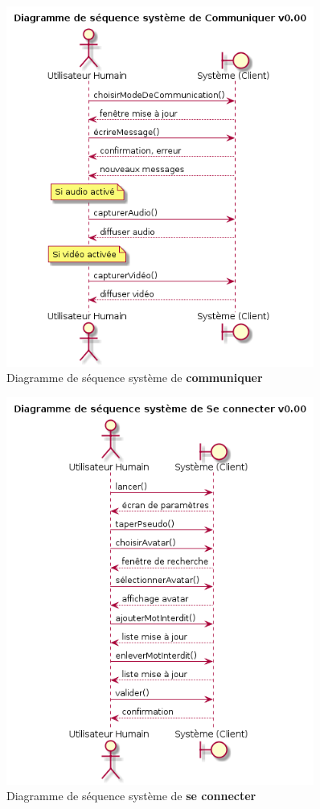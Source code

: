 \documentclass[11pt,dvipsnames,svgnames]{report}
\begin{document}
\begin{figure}[H]
\caption{Diagramme de séquence système de \textbf{communiquer}}
\centerline{\includegraphics[width=0.9\textwidth]{diagrammes/dss-communiquer.png}}
\end{figure}

\begin{figure}[H]
\caption{Diagramme de séquence système de \textbf{se connecter}}
\centerline{\includegraphics[width=0.9\textwidth]{diagrammes/dss-connexion.png}}
\end{figure}
\end{document}
